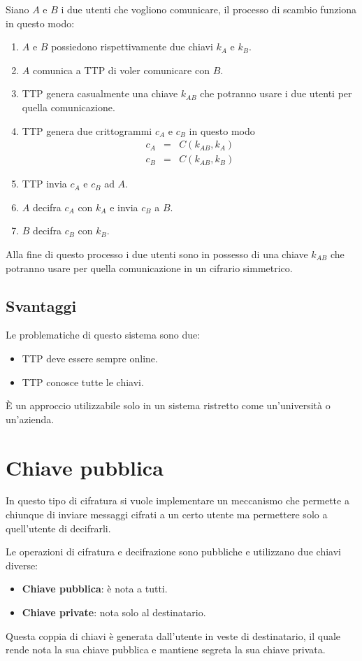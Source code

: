 Siano $A$ e $B$ i due utenti che vogliono comunicare, il processo di scambio funziona in questo modo:
\begin{enumerate}
	\item $A$ e $B$ possiedono rispettivamente due chiavi $k_A$ e $k_B$.
	\item $A$ comunica a TTP di voler comunicare con $B$.
	\item TTP genera casualmente una chiave $k_{AB}$ che potranno usare i due utenti per quella comunicazione.
	\item TTP genera due crittogrammi $c_A$ e $c_B$ in questo modo
	      \[
		      \begin{matrix}
			      c_A & = & C(k_{AB}, k_A) \\
			      c_B & = & C(k_{AB}, k_B)
		      \end{matrix}
	      \]
	\item TTP invia $c_A$ e $c_B$ ad $A$.
	\item $A$ decifra $c_A$ con $k_A$ e invia $c_B$ a $B$.
	\item $B$ decifra $c_B$ con $k_B$.
\end{enumerate}
Alla fine di questo processo i due utenti sono in possesso di una chiave $k_{AB}$ che potranno usare per quella
comunicazione in un cifrario simmetrico.

\subsection{Svantaggi}
Le problematiche di questo sistema sono due:
\begin{itemize}
	\item TTP deve essere sempre online.
	\item TTP conosce tutte le chiavi.
\end{itemize}
\`E un approccio utilizzabile solo in un sistema ristretto come un'universit\`a o un'azienda.

\section{Chiave pubblica}
In questo tipo di cifratura si vuole implementare un meccanismo che permette a chiunque di inviare messaggi cifrati a
un certo utente ma permettere solo a quell'utente di decifrarli.

Le operazioni di cifratura e decifrazione sono pubbliche e utilizzano due chiavi diverse:
\begin{itemize}
	\item \textbf{Chiave pubblica}: \`e nota a tutti.
	\item \textbf{Chiave private}: nota solo al destinatario.
\end{itemize}
Questa coppia di chiavi \`e generata dall'utente in veste di destinatario, il quale rende nota la sua chiave pubblica e
mantiene segreta la sua chiave privata.

